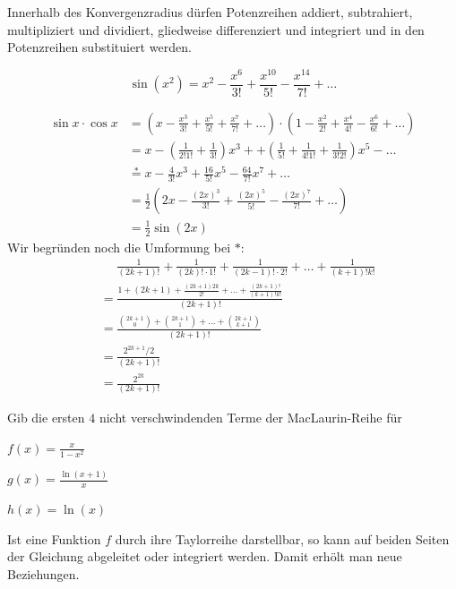 \documentclass[%
draft,
11pt,%
twoside,%
titlepage,%
german,%
headsepline%
]{scrartcl}
\begin{document}
\begin{satz}
Innerhalb des Konvergenzradius d\"urfen Potenzreihen addiert, subtrahiert, multipliziert und dividiert, gliedweise differenziert und integriert und in den Potenzreihen substituiert werden.
\end{satz}

\begin{bsp}
$$\sin(x^2)=x^2-\frac{x^6}{3!}+\frac{x^{10}}{5!}-\frac{x^{14}}{7!}+\dots$$
\end{bsp}

\begin{bsp}
\begin{align*}
\sin x\cdot\cos x &= \left(x-\frac{x^3}{3!}+\frac{x^5}{5!}+\frac{x^7}{7!}+\dots\right)
\cdot\left(1-\frac{x^2}{2!}+\frac{x^4}{4!}-\frac{x^6}{6!}+\dots\right)\\
 &= x-\left(\frac{1}{2!1!}+\frac{1}{3!}\right)x^3+
 +\left(\frac{1}{5!}+\frac{1}{4!1!}+\frac{1}{3!2!}\right)x^5-\dots\\
 &\stackrel{*}{=}x-\frac{4}{3!}x^3+\frac{16}{5!}x^5-\frac{64}{7!}x^7+\dots\\
 &=\frac{1}{2}\left(2x-\frac{(2x)^3}{3!}+\frac{(2x)^5}{5!}-\frac{(2x)^7}{7!}+\dots\right)\\
 &=\frac{1}{2}\sin(2x)
\end{align*}
Wir begr\"unden noch die Umformung bei $*$:
\begin{align*}
&\phantom{=}\frac{1}{(2k+1)!}+\frac{1}{(2k)!\cdot1!}+\frac{1}{(2k-1)!\cdot2!}
+\dots+\frac{1}{(k+1)!k!}\\
&=\frac{1+(2k+1)+\frac{(2k+1)2k}{2!}+\dots+\frac{(2k+1)!}{(k+1)!k!}}{(2k+1)!}\\
&=\frac{\binom{2k+1}{0}+\binom{2k+1}{1}+\dots+\binom{2k+1}{k+1}}{(2k+1)!}\\
&=\frac{2^{2k+1}/2}{(2k+1)!}\\
&=\frac{2^{2k}}{(2k+1)!}
\end{align*}
\end{bsp}

\begin{ueb}
Gib die ersten $4$ nicht verschwindenden Terme der MacLaurin-Reihe f\"ur
\begin{enumeratea}
\item $f(x)=\frac{x}{1-x^2}$
\item $g(x)=\frac{\ln(x+1)}{x}$
\item $h(x)=\ln(x)$
\end{enumeratea}
\end{ueb}

Ist eine Funktion $f$ durch ihre Taylorreihe darstellbar, so kann auf beiden Seiten der Gleichung abgeleitet oder integriert werden. Damit erh\"olt man neue Beziehungen.
\end{document}
